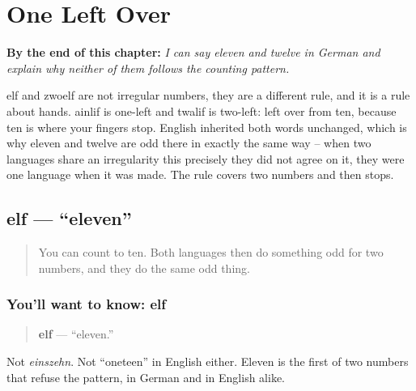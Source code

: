 
\chapter{One Left Over}
\label{ch:elf-zwoelf}

\begin{chapteropening}
\textbf{By the end of this chapter:} \emph{I can say eleven and twelve in German and explain why neither of them follows the counting pattern.}

elf and zwoelf are not irregular numbers, they are a different rule, and it is a rule about hands. ainlif is one-left and twalif is two-left: left over from ten, because ten is where your fingers stop. English inherited both words unchanged, which is why eleven and twelve are odd there in exactly the same way -- when two languages share an irregularity this precisely they did not agree on it, they were one language when it was made. The rule covers two numbers and then stops.
\end{chapteropening}

\section[elf]{elf — \textquotedblleft{}eleven\textquotedblright{}}

\label{lesson:GE-C12-elf}



\begin{quote}
You can count to ten. Both languages then do something odd for two numbers, and they do the same odd thing.
\end{quote}

\subsection*{You'll want to know: elf}
\begin{quote}
\textbf{elf} — \textquotedblleft{}eleven.\textquotedblright{}
\end{quote}

Not \emph{einszehn}. Not \textquotedblleft{}oneteen\textquotedblright{} in English either. Eleven is the first of two numbers that refuse the pattern, in German and in English alike.

